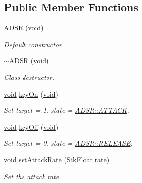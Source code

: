 \subsection*{Public Member Functions}
\begin{DoxyCompactItemize}
\item 
\hyperlink{class_nyq_1_1_a_d_s_r_ac2f92bbf2ca05a8fde7d7a703845999d}{A\+D\+SR} (\hyperlink{sound_8c_ae35f5844602719cf66324f4de2a658b3}{void})
\begin{DoxyCompactList}\small\item\em Default constructor. \end{DoxyCompactList}\item 
\hyperlink{class_nyq_1_1_a_d_s_r_aadf84fe41cff1b78edd9a7080e1f7ad7}{$\sim$\+A\+D\+SR} (\hyperlink{sound_8c_ae35f5844602719cf66324f4de2a658b3}{void})
\begin{DoxyCompactList}\small\item\em Class destructor. \end{DoxyCompactList}\item 
\hyperlink{sound_8c_ae35f5844602719cf66324f4de2a658b3}{void} \hyperlink{class_nyq_1_1_a_d_s_r_a89a1ab0e372e4b3ab068c31cc01255dd}{key\+On} (\hyperlink{sound_8c_ae35f5844602719cf66324f4de2a658b3}{void})
\begin{DoxyCompactList}\small\item\em Set target = 1, state = {\itshape \hyperlink{class_nyq_1_1_a_d_s_r_ab800aaf78adb724e9df53dbbb3080fcca03ee2ed1032efbbb7e4a1a031be5aa09}{A\+D\+S\+R\+::\+A\+T\+T\+A\+CK}}. \end{DoxyCompactList}\item 
\hyperlink{sound_8c_ae35f5844602719cf66324f4de2a658b3}{void} \hyperlink{class_nyq_1_1_a_d_s_r_a85180b7c6617493d782e3ddcf68c1235}{key\+Off} (\hyperlink{sound_8c_ae35f5844602719cf66324f4de2a658b3}{void})
\begin{DoxyCompactList}\small\item\em Set target = 0, state = {\itshape \hyperlink{class_nyq_1_1_a_d_s_r_ab800aaf78adb724e9df53dbbb3080fccab5aaef8c0d6b0140ece1a6147cb76926}{A\+D\+S\+R\+::\+R\+E\+L\+E\+A\+SE}}. \end{DoxyCompactList}\item 
\hyperlink{sound_8c_ae35f5844602719cf66324f4de2a658b3}{void} \hyperlink{class_nyq_1_1_a_d_s_r_abbc53855f833325affe4204684a23c76}{set\+Attack\+Rate} (\hyperlink{namespace_nyq_a044fa20a706520a617bbbf458a7db7e4}{Stk\+Float} \hyperlink{seqread_8c_ad89d3fac2deab7a9cf6cfc8d15341b85}{rate})
\begin{DoxyCompactList}\small\item\em Set the attack rate. \end{DoxyCompactList}\item 

\end{DoxyCompactItemize}
